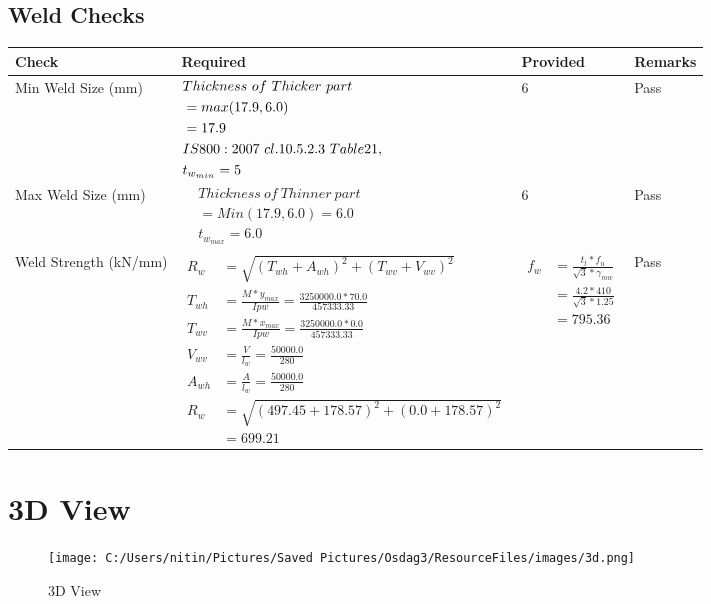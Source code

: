 \documentclass{article}%
\begin{document}
\subsection{Weld Checks}%
\label{subsec:WeldChecks}%
\renewcommand{\arraystretch}{1.2}%
\begin{longtable}{|p{4cm}|p{7.0cm}|p{3.5cm}|p{1.5cm}|}%
\hline%
\rowcolor{OsdagGreen}%
Check&Required&Provided&Remarks\\%
\hline%
\endhead%
\hline%
Min Weld Size (mm)&$\begin{aligned} &Thickness~of~Thicker~part\\ \noindent &=max(17.9,6.0)\\ &=17.9\\ &IS800:2007~cl.10.5.2.3~Table 21,\\  &t_{w_{min}}=5\end{aligned}$&6&Pass\\%
\hline%
Max Weld Size (mm)&$\begin{aligned} & Thickness~of~Thinner~part\\ &=Min(17.9,6.0)=6.0\\ &t_{w_{max}} =6.0\end{aligned}$&6&Pass\\%
\hline%
Weld Strength (kN/mm)&$\begin{aligned} R_w&=\sqrt{(T_{wh}+A_{wh})^2 + (T_{wv}+V_{wv})^2}\\ T_{wh}&=\frac{M*y_{max}}{I{pw}}=\frac{3250000.0*70.0}{457333.33}\\ T_{wv}&=\frac{M*x_{max}}{I{pw}}=\frac{3250000.0*0.0}{457333.33}\\ V_{wv}&=\frac{V}{l_w}=\frac{50000.0}{280}\\ A_{wh}&=\frac{A}{l_w}=\frac{50000.0}{280}\\ R_w&=\sqrt{(497.45+178.57)^2 + (0.0+178.57)^2}\\ &=699.21\end{aligned}$&$\begin{aligned} f_w &=\frac{t_t*f_u}{\sqrt{3}*\gamma_{mw}}\\ &=\frac{4.2*410}{\sqrt{3}*1.25}\\ &=795.36\end{aligned}$&Pass\\%
\hline%
\end{longtable}

%
%
\newpage%
\section{3D View}%
\label{sec:3DView}%


\begin{figure}[h!]%
\centering%
\texttt{[image: C:/Users/nitin/Pictures/Saved Pictures/Osdag3/ResourceFiles/images/3d.png]}%
\caption{3D View}%
\end{figure}

%
\end{document}
